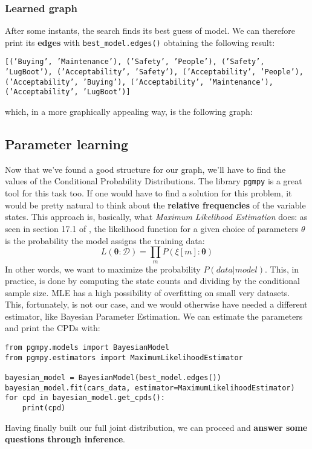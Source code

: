 \subsubsection{Learned graph}
After some instants, the search finds its best guess of model. We can therefore print its \textbf{edges} with \texttt{best\_model.edges()} obtaining the following result:
\begin{center}
\texttt{[('Buying', 'Maintenance'), ('Safety', 'People'), ('Safety', 'LugBoot'), ('Acceptability', 'Safety'), ('Acceptability', 'People'), ('Acceptability', 'Buying'), ('Acceptability', 'Maintenance'), ('Acceptability', 'LugBoot')]}
\end{center}
which, in a more graphically appealing way, is the following graph:
\subsection{Parameter learning}
Now that we've found a good structure for our graph, we'll have to find the values of the Conditional Probability Distributions. The library \texttt{pgmpy} is a great tool for this task too. If one would have to find a solution for this problem, it would be pretty natural to think about the \textbf{relative frequencies} of the variable states. This approach is, basically, what \textit{Maximum Likelihood Estimation} does: as seen in section 17.1 of \cite{book:probgraphmod}, the likelihood function for a given choice of parameters $\theta$ is the probability the model assigns the training data:
\begin{equation}
L(\boldsymbol{\theta}: \mathcal{D})=\prod_{m} P(\xi[m]: \boldsymbol{\theta})
\end{equation}
In other words, we want to maximize the probability $P(data|model)$. This, in practice, is done by computing the state counts and dividing by the conditional sample size.
MLE has a high possibility of overfitting on small very datasets. This, fortunately, is not our case, and we would otherwise have needed a different estimator, like Bayesian Parameter Estimation. We can estimate the parameters and print the CPDs with:
\begin{verbatim}
from pgmpy.models import BayesianModel
from pgmpy.estimators import MaximumLikelihoodEstimator

bayesian_model = BayesianModel(best_model.edges())
bayesian_model.fit(cars_data, estimator=MaximumLikelihoodEstimator)
for cpd in bayesian_model.get_cpds():
    print(cpd)
\end{verbatim}
Having finally built our full joint distribution, we can proceed and \textbf{answer some questions through inference}.